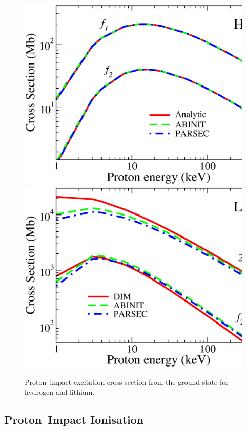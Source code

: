 \documentclass[10pt]{article}
\begin{document}
\begin{figure}[H]
\centering
 \includegraphics[height=0.23\textheight]{figures/pseudopot/Hex.eps}
 \hspace{0.4cm}
 \includegraphics[height=0.23\textheight]{figures/pseudopot/Liex.eps}
 \caption{Proton--impact excitation cross section from the ground state 
 for hydrogen and lithium.}
 \label{fig:exHLi}
\end{figure}


\subsection{Proton--Impact Ionisation}
\end{document}
